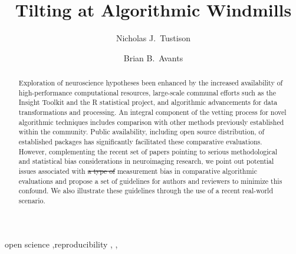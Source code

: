 \documentclass[final,5p,times,twocolumn]{elsarticle}
\newcommand{\trEdit}[1]{{\color{blue}{#1}}}
\newcommand{\trDelete}[1]{{\color{blue}\sout{#1}}}
\begin{document}



\begin{frontmatter}

\title{Tilting at Algorithmic Windmills}

\author[label1]{Nicholas J.~Tustison
  }
\author[label2]{Brian B.~Avants}
\address[label1]{Department of Radiology and Medical Imaging, University of Virginia, Charlottesville, VA}
\address[label2]{Penn Image Computing and Science Laboratory, University of Pennsylvania,
                Philadelphia, PA}


\linenumbers

\begin{abstract} 
Exploration of neuroscience hypotheses \trEdit{has} been  enhanced
by the increased availability of high-performance computational resources, large-scale
communal efforts such as the Insight Toolkit and the R statistical project, and
algorithmic advancements for data transformations and processing. 
An integral component of the vetting process for novel algorithmic techniques
includes comparison with other methods previously
established within the community.  Public availability, including 
open source distribution, of established packages has significantly 
facilitated these comparative evaluations.  However, complementing the
recent set of papers pointing to serious methodological and statistical
bias considerations in neuroimaging research, we point out potential 
issues associated with \trDelete{a type of} measurement bias in comparative algorithmic
evaluations and propose a set of guidelines for authors and reviewers
to minimize this confound.  We also illustrate these guidelines
through the use of a recent real-world scenario.
\end{abstract}
\begin{keyword}
open science \sep reproducibility  \sep \trEdit{software} \sep \trEdit{instrument bias}
\end{keyword}

\end{frontmatter}
%
%
\newpage
\end{document}

